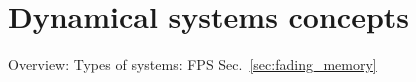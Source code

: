 \documentclass{article}
\theoremstyle{definition} \newtheorem{definition}{Definition}
\theoremstyle{remark} \newtheorem{remark}{Remark}
\newcounter{ct}
\begin{document}
%
%
%
%





\newpage
\section{Dynamical systems concepts}
Overview: 
Types of systems: FPS Sec.~\ref{sec:fading_memory}
\end{document}
